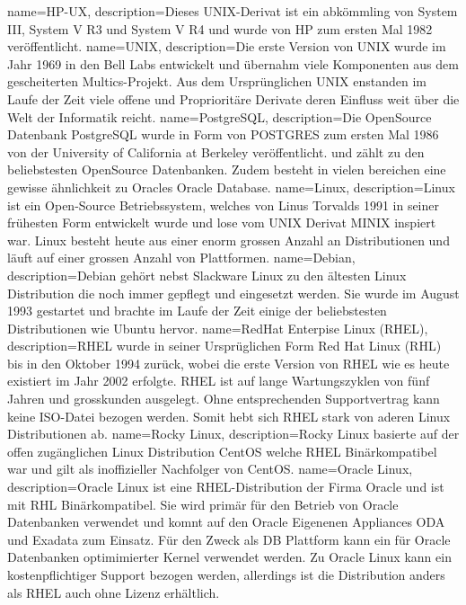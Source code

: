 
\makenoidxglossaries
{}
{
        name=HP-UX,
        description={Dieses UNIX-Derivat ist ein abkömmling von System III, System V R3 und System V R4 und wurde von HP zum ersten Mal 1982 veröffentlicht.}
}
{
        name=UNIX,
        description={Die erste Version von UNIX wurde im Jahr 1969 in den Bell Labs entwickelt und übernahm viele Komponenten aus dem gescheiterten Multics-Projekt.
        Aus dem Ursprünglichen UNIX enstanden im Laufe der Zeit viele offene und Proprioritäre Derivate deren Einfluss weit über die Welt der Informatik reicht.}
}
{
        name=PostgreSQL,
        description={Die OpenSource Datenbank PostgreSQL wurde in Form von POSTGRES zum ersten Mal 1986 von der University of California at Berkeley veröffentlicht.
und zählt zu den beliebstesten OpenSource Datenbanken.
Zudem besteht in vielen bereichen eine gewisse ähnlichkeit zu Oracles Oracle Database.}
}
{
        name=Linux,
        description={Linux ist ein Open-Source Betriebssystem, welches von Linus Torvalds 1991 in seiner frühesten Form entwickelt wurde und lose vom UNIX Derivat MINIX inspiert war.
        Linux besteht heute aus einer enorm grossen Anzahl an Distributionen und läuft auf einer grossen Anzahl von Plattformen.}
}
{
        name=Debian,
        description={Debian gehört nebst Slackware Linux zu den ältesten Linux Distribution die noch immer gepflegt und eingesetzt werden.
        Sie wurde im August 1993 gestartet und brachte im Laufe der Zeit einige der beliebstesten Distributionen wie Ubuntu hervor.}
}
{
        name=RedHat Enterpise Linux (RHEL),
        description={RHEL wurde in seiner Ursprüglichen Form Red Hat Linux (RHL) bis in den Oktober 1994 zurück, wobei die erste Version von RHEL wie es heute existiert im Jahr 2002 erfolgte.
        RHEL ist auf lange Wartungszyklen von fünf Jahren und grosskunden ausgelegt.
        Ohne entsprechenden Supportvertrag kann keine ISO-Datei bezogen werden.
        Somit hebt sich RHEL stark von aderen Linux Distributionen ab.}
}
{
        name=Rocky Linux,
        description={Rocky Linux basierte auf der offen zugänglichen Linux Distribution CentOS welche RHEL Binärkompatibel war und gilt als inoffizieller Nachfolger von CentOS.}
}
{
        name=Oracle Linux,
        description={Oracle Linux ist eine RHEL-Distribution der Firma Oracle und ist mit RHL Binärkompatibel.
        Sie wird primär für den Betrieb von Oracle Datenbanken verwendet und komnt auf den Oracle Eigenenen Appliances ODA und Exadata zum Einsatz.
        Für den Zweck als DB Plattform kann ein für Oracle Datenbanken optimimierter Kernel verwendet werden.
        Zu Oracle Linux kann ein kostenpflichtiger Support bezogen werden, allerdings ist die Distribution anders als RHEL auch ohne Lizenz erhältlich.}
}

